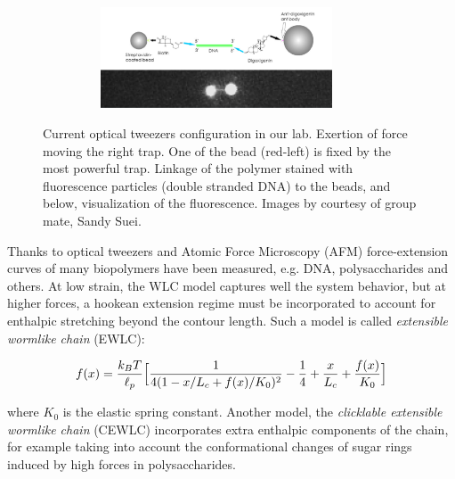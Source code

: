 \begin{figure}[ht]
\begin{minipage}{0.35\textwidth}
  \begin{subfigure}{0.99\textwidth}
    \includegraphics[width=0.9\textwidth,height=3cm]{Figures/chapter-intro/tweezers_linkage.png}%
    \caption{\label{tweezers-linkage}}
  \end{subfigure}
\end{minipage}

\caption[Optical Tweezers]{\protect{} Current
optical tweezers configuration in our lab. \protect{}
Exertion of force moving the right trap. One of the bead (red-left) is fixed by
the most powerful trap. \protect{} Linkage of the
 polymer stained with fluorescence particles (double stranded DNA) to the beads,
 and below, visualization of the fluorescence. Images by courtesy of group mate,
 Sandy Suei. }
\label{fig:optical_tweezers}
\end{figure}


Thanks to optical tweezers and Atomic Force Microscopy
(AFM)\citep{janshoff_force_2000} force-extension curves of many
biopolymers have been measured, e.g. DNA\citep{marko_stretching_1995},
polysaccharides\citep{marszalek_atomic_1999} and others. At low strain, the WLC
model captures well the system behavior, but at higher forces, a hookean
extension regime must be incorporated to account for enthalpic stretching
beyond the contour length.
Such a model is called \emph{extensible wormlike chain}
(EWLC)\citep{wang_stretching_1997}:

\begin{equation}\label{EWLC}
f(x)=\frac{k_B{}T}{\ell_p} \Big[ \frac{1}{4(1 - x/L_c + f(x)/K_0)^2}
-\frac{1}{4}+\frac{x}{L_c} + \frac{f(x)}{K_0}\Big]
\end{equation}


where $K_0$ is the elastic spring constant. Another model, the
\emph{clicklable extensible wormlike chain} (CEWLC) incorporates extra
enthalpic components of the chain, for example taking into
account the conformational changes of sugar rings induced by high forces in polysaccharides\citep{haverkamp_model_2007}.


